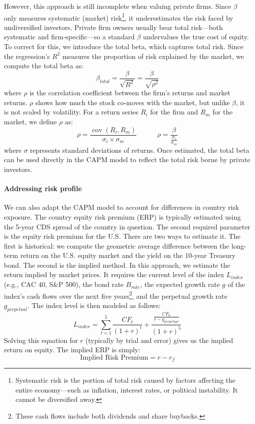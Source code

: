 However, this approach is still incomplete when valuing private firms. Since $\beta$ only measures systematic (market) risk\footnote{Systematic risk is the portion of total risk caused by factors affecting the entire economy—such as inflation, interest rates, or political instability. It cannot be diversified away.}, it underestimates the risk faced by undiversified investors. Private firm owners usually bear total risk—both systematic and firm-specific—so a standard $\beta$ undervalues the true cost of equity. To correct for this, we introduce the total beta, which captures total risk. Since the regression’s $R^2$ measures the proportion of risk explained by the market, we compute the total beta as:
\begin{equation}
    \beta_{total} = \frac{\beta}{\sqrt{R^2}} = \frac{\beta}{\sqrt{\rho^2}}
\end{equation}
where $\rho$ is the correlation coefficient between the firm's returns and market returns. $\rho$ shows how much the stock co-moves with the market, but unlike $\beta$, it is not scaled by volatility. For a return series $R_i$ for the firm and $R_m$ for the market, we define $\rho$ as:
\begin{equation}
    \rho = \frac{\operatorname{cov}(R_i,R_m)}{\sigma_i\times\sigma_m} \qquad \quad \rho = \frac{\beta}{\displaystyle\frac{\sigma_i}{\sigma_m}}
\end{equation}
where $\sigma$ represents standard deviations of returns. Once estimated, the total beta can be used directly in the CAPM model to reflect the total risk borne by private investors.

\paragraph{Addressing risk profile}

We can also adapt the CAPM model to account for differences in country risk exposure. The country equity risk premium (ERP) is typically estimated using the 5-year CDS spread of the country in question. The second required parameter is the equity risk premium for the U.S. There are two ways to estimate it. The first is historical: we compute the geometric average difference between the long-term return on the U.S. equity market and the yield on the 10-year Treasury bond. The second is the implied method. In this approach, we estimate the return implied by market prices. It requires the current level of the index $L_{index}$ (e.g., CAC 40, S\&P 500), the bond rate $B_{rate}$, the expected growth rate $g$ of the index’s cash flows over the next five years\footnote{These cash flows include both dividends and share buybacks.}, and the perpetual growth rate $g_{perpetual}$. The index level is then modeled as follows:
\begin{equation}
L_{index} = \sum^5_{t=1}\frac{CF_t}{(1+r)^t} + \frac{\frac{CF_6}{r - g_{perpetual}}}{(1+r)^5}
\end{equation}
Solving this equation for $r$ (typically by trial and error) gives us the implied return on equity. The implied ERP is simply:
\begin{equation}
    \text{Implied Risk Premium} = r - r_f
\end{equation}

